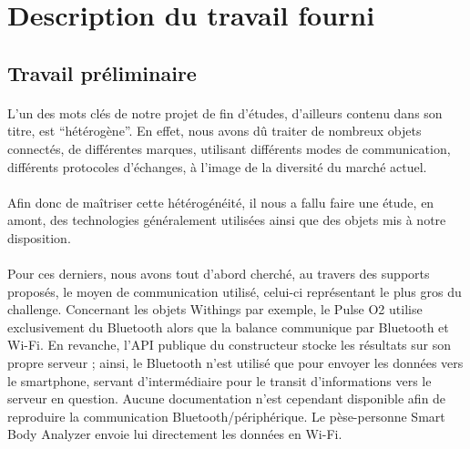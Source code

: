 \documentclass[nocopyrightspace]{sigplanconf}
\begin{document}
\section{Description du travail fourni}

	\subsection{Travail préliminaire}
		\paragraph{}
		L’un des mots clés de notre projet de fin d’études, d’ailleurs contenu dans son titre, est “hétérogène”. En effet, nous avons dû traiter de nombreux objets connectés, de différentes marques, utilisant différents modes de communication, différents protocoles d’échanges, à l’image de la diversité du marché actuel.

		\paragraph{}
		Afin donc de maîtriser cette hétérogénéité, il nous a fallu faire une étude, en amont, des technologies généralement utilisées ainsi que des objets mis à notre disposition.

		\paragraph{}
		Pour ces derniers, nous avons tout d’abord cherché, au travers des supports proposés, le moyen de communication utilisé, celui-ci représentant le plus gros du challenge. Concernant les objets Withings par exemple, le Pulse O2\cite{withings-pulse} utilise exclusivement du Bluetooth alors que la balance communique par Bluetooth et Wi-Fi. En revanche, l’API publique du constructeur stocke les résultats sur son propre serveur ; ainsi, le Bluetooth n’est utilisé que pour envoyer les données vers le smartphone, servant d’intermédiaire pour le transit d’informations vers le serveur en question. Aucune documentation n’est cependant disponible afin de reproduire la communication Bluetooth/périphérique. Le pèse-personne Smart Body Analyzer envoie lui directement les données en Wi-Fi.
\end{document}
